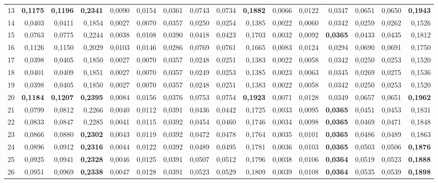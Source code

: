 \begin{table}[htp!]
\begin{adjustwidth}{-2cm}{}
\begin{tabular}{ l | *{15}{| r}}
13	&	\textbf{0,1175}	&	\textbf{0,1196}	&	\textbf{0,2341}	&	0,0090	&	0,0154	&	0,0361	&	0,0743	&	0,0734	&	\textbf{0,1882}	&	0,0066	&	0,0122	&	0,0347	&	0,0651	&	0,0650	&	\textbf{0,1943}	\\
14	&	0,0403	&	0,0411	&	0,1854	&	0,0027	&	0,0070	&	0,0357	&	0,0250	&	0,0254	&	0,1385	&	0,0022	&	0,0060	&	0,0342	&	0,0259	&	0,0262	&	0,1526	\\
15	&	0,0763	&	0,0775	&	0,2244	&	0,0038	&	0,0108	&	0,0390	&	0,0418	&	0,0423	&	0,1703	&	0,0032	&	0,0092	&	\textbf{0,0365}	&	0,0433	&	0,0435	&	0,1812	\\
16	&	0,1126	&	0,1150	&	0,2029	&	0,0103	&	0,0146	&	0,0286	&	0,0769	&	0,0761	&	0,1665	&	0,0083	&	0,0124	&	0,0294	&	0,0690	&	0,0691	&	0,1750	\\
17	&	0,0398	&	0,0405	&	0,1850	&	0,0027	&	0,0070	&	0,0357	&	0,0248	&	0,0251	&	0,1383	&	0,0022	&	0,0058	&	0,0342	&	0,0250	&	0,0253	&	0,1520	\\
18	&	0,0401	&	0,0409	&	0,1851	&	0,0027	&	0,0070	&	0,0357	&	0,0249	&	0,0253	&	0,1385	&	0,0023	&	0,0063	&	0,0345	&	0,0269	&	0,0275	&	0,1536	\\
19	&	0,0398	&	0,0405	&	0,1850	&	0,0027	&	0,0070	&	0,0357	&	0,0248	&	0,0251	&	0,1383	&	0,0022	&	0,0058	&	0,0342	&	0,0250	&	0,0253	&	0,1520	\\
20	&	\textbf{0,1184}	&	\textbf{0,1207}	&	\textbf{0,2395}	&	0,0084	&	0,0156	&	0,0376	&	0,0753	&	0,0754	&	\textbf{0,1923}	&	0,0071	&	0,0128	&	0,0349	&	0,0657	&	0,0651	&	\textbf{0,1962}	\\
21	&	0,0799	&	0,0812	&	0,2266	&	0,0040	&	0,0112	&	0,0391	&	0,0436	&	0,0442	&	0,1725	&	0,0033	&	0,0095	&	\textbf{0,0365}	&	0,0451	&	0,0453	&	0,1831	\\
22	&	0,0833	&	0,0847	&	0,2285	&	0,0041	&	0,0115	&	0,0392	&	0,0454	&	0,0460	&	0,1746	&	0,0034	&	0,0098	&	\textbf{0,0365}	&	0,0469	&	0,0471	&	0,1848	\\
23	&	0,0866	&	0,0880	&	\textbf{0,2302}	&	0,0043	&	0,0119	&	0,0392	&	0,0472	&	0,0478	&	0,1764	&	0,0035	&	0,0101	&	\textbf{0,0365}	&	0,0486	&	0,0489	&	0,1863	\\
24	&	0,0896	&	0,0912	&	\textbf{0,2316}	&	0,0044	&	0,0122	&	0,0392	&	0,0489	&	0,0495	&	0,1781	&	0,0036	&	0,0103	&	\textbf{0,0365}	&	0,0503	&	0,0506	&	\textbf{0,1876}	\\
25	&	0,0925	&	0,0941	&	\textbf{0,2328}	&	0,0046	&	0,0125	&	0,0391	&	0,0507	&	0,0512	&	0,1796	&	0,0038	&	0,0106	&	\textbf{0,0364}	&	0,0519	&	0,0523	&	\textbf{0,1888}	\\
26	&	0,0951	&	0,0969	&	\textbf{0,2338}	&	0,0047	&	0,0128	&	0,0391	&	0,0523	&	0,0529	&	0,1809	&	0,0039	&	0,0108	&	\textbf{0,0364}	&	0,0535	&	0,0539	&	\textbf{0,1898}	\\

\end{tabular}
\end{adjustwidth}
\end{table}
